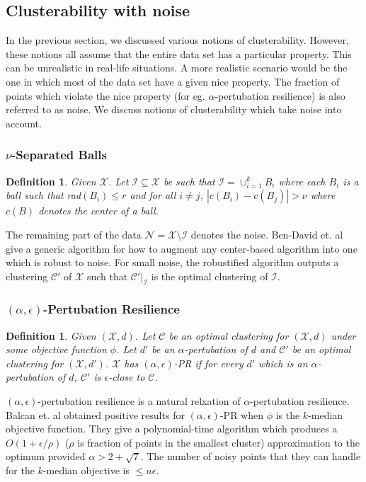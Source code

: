 \documentclass[twoside]{article}
\newcommand{\mc}{\mathcal}
\newtheorem{definition}[theorem]{Definition}
\begin{document}
\subsection{Clusterability with noise}
In the previous section, we discussed various notions of clusterability. However, these notions all assume that the entire data set has a particular property. This can be unrealistic in real-life situations. A more realistic scenario would be the one in which most of the data set have a given nice property. The fraction of points which violate the nice property (for eg. $\alpha$-pertubation resilience) is also referred to as noise. We discuss notions of clusterability which take noise into account. 


\subsubsection*{$\nu$-Separated Balls \cite{ben2014clustering}}
\begin{definition}
Given $\mc X$. Let $\mc I \subseteq \mc X$ be such that $\mc I = \cup_{i=1}^k B_i$ where each $B_i$ is a ball such that rad$(B_i) \le r$ and for all $i \neq j$, $|c(B_i)-c(B_j)| > \nu$ where $c(B)$ denotes the center of a ball.
\end{definition}
The remaining part of the data $\mc N = \mc X \setminus \mc I$ denotes the noise. Ben-David et. al \cite{ben2014clustering} give a generic algorithm for how to augment any center-based algorithm into one which is robust to noise. For small noise, the robustified algorithm outputs a clustering $\mc C'$ of $\mc X$ such that $\mc C'|_{\mc I}$ is the optimal clustering of $\mc I$.


\subsubsection*{$(\alpha, \epsilon)$-Pertubation Resilience \cite{balcan2012clustering}}
\begin{definition}
Given $(\mc X, d)$. Let $\mc C$ be an optimal clustering for $(\mc X, d)$ under some objective function $\phi$. Let $d'$ be an $\alpha$-pertubation of $d$ and $\mc C'$ be an optimal clustering for $(\mc X, d')$. $\mc X$ has $(\alpha, \epsilon)$-PR if for every $d'$ which is an $\alpha$-pertubation of $d$, $\mc C'$ is $\epsilon$-close to $\mc C$.
\end{definition}
$(\alpha, \epsilon)$-pertubation resilience is a natural relxation of $\alpha$-pertubation resilience. Balcan et. al \cite{balcan2012clustering} obtained positive results for $(\alpha, \epsilon)$-PR when $\phi$ is the $k$-median objective function. They give a polynomial-time algorithm which produces a $O(1+\epsilon/\rho)$ ($\rho$ is fraction of points in the smallest cluster) approximation to the optimum provided $\alpha > 2 + \sqrt{7}$. The number of noisy points that they can handle for the $k$-median objective is $\le n\epsilon$.
\end{document}
